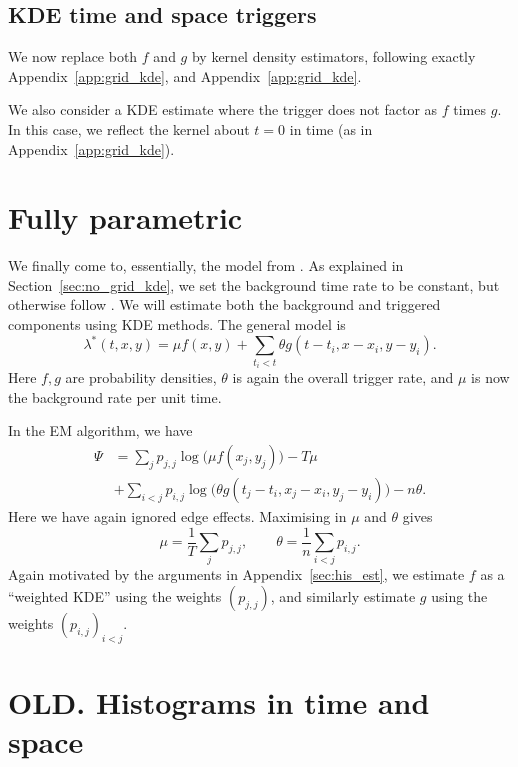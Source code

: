 \documentclass[twoside,a4paper]{article}
\theoremstyle{plain}
\theoremstyle{definition}
\begin{document}
\subsection{KDE time and space triggers}

We now replace both $f$ and $g$ by kernel density estimators, following exactly
Appendix~\ref{app:grid_kde}, and Appendix~\ref{app:grid_kde}.

We also consider a KDE estimate where the trigger does not factor as $f$ times $g$.
In this case, we reflect the kernel about $t=0$ in time (as in Appendix~\ref{app:grid_kde}).




\section{Fully parametric}

We finally come to, essentially, the model from \cite{sepp2}.
As explained in Section~\ref{sec:no_grid_kde}, we set the background time rate to
be constant, but otherwise follow \cite{sepp2}.
We will estimate both the background and triggered components using KDE methods.
The general model is
\[ \lambda^*(t,x,y) = \mu f(x,y) + \sum_{t_i<t} \theta g(t-t_i, x-x_i, y-y_i). \]
Here $f,g$ are probability densities, $\theta$ is again the overall trigger rate,
and $\mu$ is now the background rate per unit time.

In the EM algorithm, we have
\begin{align*} \Psi &= \sum_j p_{j,j} \log\big(\mu f(x_j,y_j)\big) - T\mu \\
&+ \sum_{i<j} p_{i,j} \log\big( \theta g(t_j-t_i, x_j-x_i, y_j-y_i) \big) - n\theta.
\end{align*}
Here we have again ignored edge effects.
Maximising in $\mu$ and $\theta$ gives
\[ \mu = \frac{1}{T} \sum_j p_{j,j}, \qquad
\theta = \frac1n \sum_{i<j} p_{i,j}. \]
Again motivated by the arguments in Appendix~\ref{sec:his_est}, we estimate $f$ as a
``weighted KDE'' using the weights $(p_{j,j})$, and similarly estimate $g$ using the
weights $(p_{i,j})_{i<j}$.





\section{OLD.  Histograms in time and space}
\end{document}
